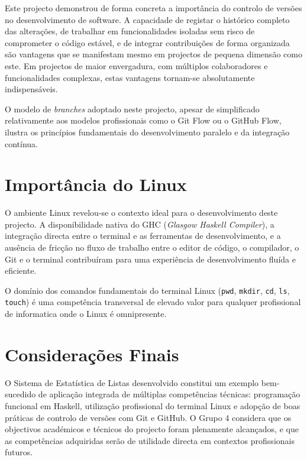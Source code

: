 \documentclass[12pt, a4paper, oneside]{report}
\begin{document}
Este projecto demonstrou de forma concreta a importância do controlo de versões no desenvolvimento de software. A capacidade de registar o histórico completo das alterações, de trabalhar em funcionalidades isoladas sem risco de comprometer o código estável, e de integrar contribuições de forma organizada são vantagens que se manifestam mesmo em projectos de pequena dimensão como este. Em projectos de maior envergadura, com múltiplos colaboradores e funcionalidades complexas, estas vantagens tornam-se absolutamente indispensáveis.

O modelo de \textit{branches} adoptado neste projecto, apesar de simplificado relativamente aos modelos profissionais como o Git Flow ou o GitHub Flow, ilustra os princípios fundamentais do desenvolvimento paralelo e da integração contínua.

\section{Importância do Linux}

O ambiente Linux revelou-se o contexto ideal para o desenvolvimento deste projecto. A disponibilidade nativa do GHC (\textit{Glasgow Haskell Compiler}), a integração directa entre o terminal e as ferramentas de desenvolvimento, e a ausência de fricção no fluxo de trabalho entre o editor de código, o compilador, o Git e o terminal contribuíram para uma experiência de desenvolvimento fluída e eficiente.

O domínio dos comandos fundamentais do terminal Linux (\texttt{pwd}, \texttt{mkdir}, \texttt{cd}, \texttt{ls}, \texttt{touch}) é uma competência transversal de elevado valor para qualquer profissional de informatica onde o Linux é omnipresente.

\section{Considerações Finais}

O Sistema de Estatística de Listas desenvolvido constitui um exemplo bem-sucedido de aplicação integrada de múltiplas competências técnicas: programação funcional em Haskell, utilização profissional do terminal Linux e adopção de boas práticas de controlo de versões com Git e GitHub. O Grupo 4 considera que os objectivos académicos e técnicos do projecto foram plenamente alcançados, e que as competências adquiridas serão de utilidade directa em contextos profissionais futuros.

\end{document}
